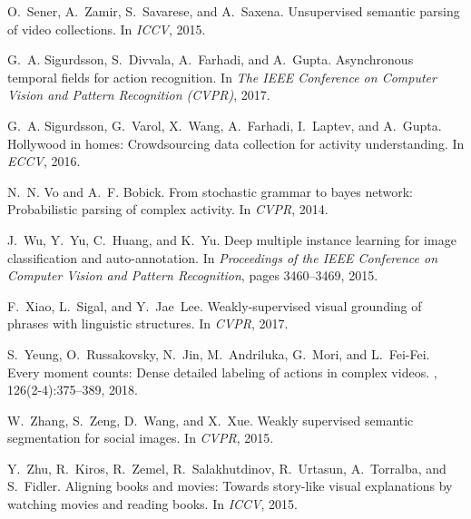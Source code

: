 \documentclass[10pt,twocolumn,letterpaper]{article}
\begin{document}
{\begin{thebibliography}{10}
O.~Sener, A.~Zamir, S.~Savarese, and A.~Saxena.
\newblock Unsupervised semantic parsing of video collections.
\newblock In {\em ICCV}, 2015.

G.~A. Sigurdsson, S.~Divvala, A.~Farhadi, and A.~Gupta.
\newblock Asynchronous temporal fields for action recognition.
\newblock In {\em The IEEE Conference on Computer Vision and Pattern
  Recognition (CVPR)}, 2017.

G.~A. Sigurdsson, G.~Varol, X.~Wang, A.~Farhadi, I.~Laptev, and A.~Gupta.
\newblock Hollywood in homes: Crowdsourcing data collection for activity
  understanding.
\newblock In {\em ECCV}, 2016.

N.~N. Vo and A.~F. Bobick.
\newblock From stochastic grammar to bayes network: Probabilistic parsing of
  complex activity.
\newblock In {\em CVPR}, 2014.

J.~Wu, Y.~Yu, C.~Huang, and K.~Yu.
\newblock Deep multiple instance learning for image classification and
  auto-annotation.
\newblock In {\em Proceedings of the IEEE Conference on Computer Vision and
  Pattern Recognition}, pages 3460--3469, 2015.

F.~Xiao, L.~Sigal, and Y.~Jae~Lee.
\newblock Weakly-supervised visual grounding of phrases with linguistic
  structures.
\newblock In {\em CVPR}, 2017.

S.~Yeung, O.~Russakovsky, N.~Jin, M.~Andriluka, G.~Mori, and L.~Fei-Fei.
\newblock Every moment counts: Dense detailed labeling of actions in complex
  videos.
, 126(2-4):375--389,
  2018.

W.~Zhang, S.~Zeng, D.~Wang, and X.~Xue.
\newblock Weakly supervised semantic segmentation for social images.
\newblock In {\em CVPR}, 2015.

Y.~Zhu, R.~Kiros, R.~Zemel, R.~Salakhutdinov, R.~Urtasun, A.~Torralba, and
  S.~Fidler.
\newblock Aligning books and movies: Towards story-like visual explanations by
  watching movies and reading books.
\newblock In {\em ICCV}, 2015.

\end{thebibliography}
 }
\end{document}
